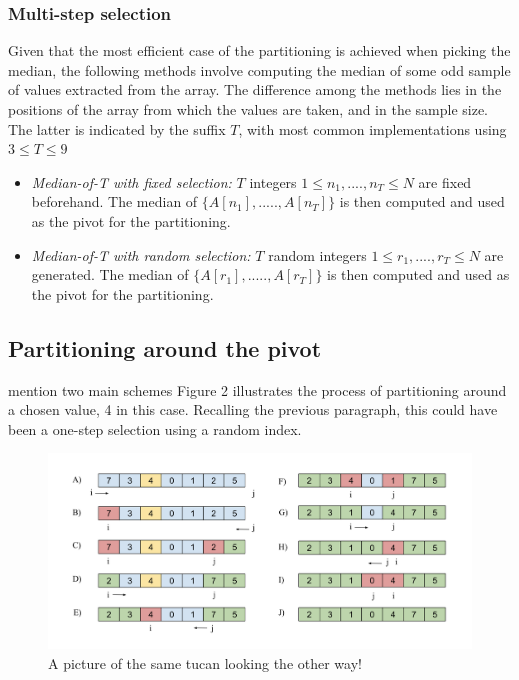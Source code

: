 \documentclass[]{finalproject}
\begin{document}
\subsubsection{Multi-step selection}
Given that the most efficient case of the partitioning is achieved when picking the median, the following methods involve computing the median of some odd sample of values extracted from the array. The difference among the methods lies in the positions of the array from which the values are taken, and in the sample size. The latter is indicated by the suffix $T$, with most common implementations using $3 \leq T \leq 9$

\begin{itemize}
\item{\textit{Median-of-T with fixed selection:}} $T$ integers $1 \leq n_{1},....,n_{T} \leq N$ are fixed beforehand. The median of $\{A[n_{1}],.....,A[n_{T}]\}$ is then computed and used as the pivot for the partitioning.
\item{\textit{Median-of-T with random selection:}} $T$ random integers $1 \leq r_{1},....,r_{T} \leq N$ are generated. The median of $\{A[r_{1}],.....,A[r_{T}]\}$ is then computed and used as the pivot for the partitioning.
\end{itemize}

\subsection{Partitioning around the pivot}
mention two main schemes
Figure 2 illustrates the process of partitioning around a chosen value, 4 in this case. Recalling the previous paragraph, this could have been a one-step selection using a random index.




\begin{figure}[H]
  \begin{center}
   \includegraphics[scale=0.5]{img/pivot_partitioning.png}
  \end{center}
  \caption{A picture of the same tucan looking the other way!}
\end{figure}
\end{document}
